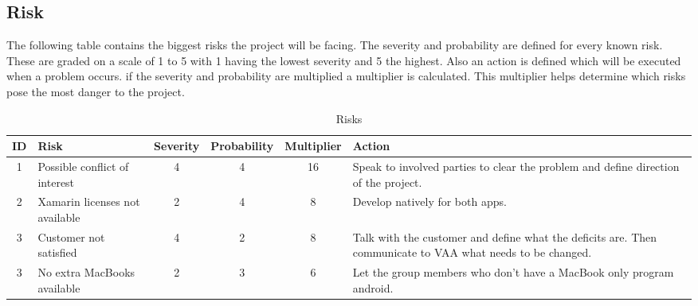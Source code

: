 \subsection{Risk}
The following table contains the biggest risks the project will be facing. The severity and probability are defined for every known risk. These are graded on a scale of 1 to 5 with 1 having the lowest severity and 5 the highest. Also an action is defined which will be executed when a problem occurs. if the severity and probability are multiplied a multiplier is calculated. This multiplier helps determine which risks pose the most danger to the project.

\begin{table}[htbp]
	{
		\begin{tabular}{c  p{3cm}  c  c  c  p{4cm} }
			ID & Risk & Severity & Probability & Multiplier & Action \\ \hline
			1 & Possible conflict of interest  & 4 & 4 & 16 & Speak to involved parties to clear the problem and define direction of the project. \\
			2 & Xamarin licenses not available & 2 & 4 & 8 & Develop natively for both apps. \\
			3 & Customer not satisfied  & 4 & 2 & 8 & Talk with the customer and define what the deficits are. Then communicate to VAA what needs to be changed.\\
			3 & No extra MacBooks available  & 2 & 3 & 6 & Let the group members who don't have a MacBook only program android. \\	
		\end{tabular}
	}
	\caption{Risks\label{risk}}
\end{table}